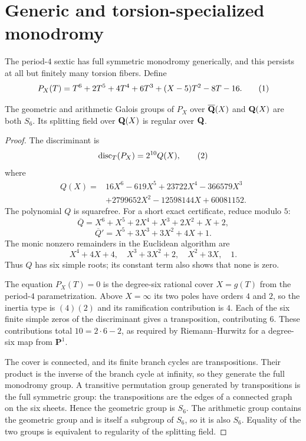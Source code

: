 \section{Generic and torsion-specialized monodromy}
\label{sec:generic-monodromy}

The period-$4$ sextic has full symmetric monodromy generically, and
this persists at all but finitely many torsion fibers.  Define
\[
 P_X(T)=T^6+2T^5+4T^4+6T^3+(X-5)T^2-8T-16.
 \numberthis\label{eq:generic-sextic}
\]

\begin{theorem}
\label{thm:generic-S6}
The geometric and arithmetic Galois groups of $P_X$ over
$\overline{\mathbf Q}(X)$ and $\mathbf Q(X)$ are both $S_6$.  Its splitting field over
$\mathbf Q(X)$ is regular over $\mathbf Q$.
\end{theorem}

\begin{proof}
The discriminant is
\[
 \operatorname{disc}_T(P_X)=2^{10}Q(X),
 \numberthis\label{eq:generic-discriminant}
\]
where
\begin{align*}
 Q(X)={}&16X^6-619X^5+23722X^4-366579X^3\\
       &+2799652X^2-12598144X+60081152.
\end{align*}
The polynomial $Q$ is squarefree.  For a short exact certificate,
reduce modulo $5$:
\[
 \overline Q=X^6+X^5+2X^4+X^3+2X^2+X+2,
\]
\[
 \overline Q'=X^5+3X^3+3X^2+4X+1.
\]
The monic nonzero remainders in the Euclidean algorithm are
\[
 X^4+4X+4,\quad X^3+3X^2+2,\quad X^2+3X,\quad1.
\]
Thus $Q$ has six simple roots; its constant term also shows that none
is zero.

The equation $P_X(T)=0$ is the degree-six rational cover
$X=g(T)$ from the period-$4$ parametrization.  Above $X=\infty$ its
two poles have orders $4$ and $2$, so the inertia type is $(4)(2)$ and
its ramification contribution is $4$.  Each of the six finite simple
zeros of the discriminant gives a transposition, contributing $6$.
These contributions total $10=2\cdot6-2$, as required by
Riemann--Hurwitz for a degree-six map from $\mathbf P^1$.

The cover is connected, and its finite branch cycles are
transpositions.  Their product is the inverse of the branch cycle at
infinity, so they generate the full monodromy group.  A transitive
permutation group generated by transpositions is the full symmetric
group: the transpositions are the edges of a connected graph on the
six sheets.  Hence the geometric group is $S_6$.  The arithmetic group
contains the geometric group and is itself a subgroup of $S_6$, so it
is also $S_6$.  Equality of the two groups is equivalent to regularity
of the splitting field.
\end{proof}

